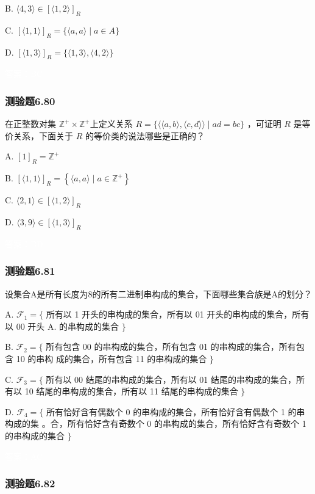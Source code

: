 \documentclass[UTF8, heading=true]{ctexart}
\begin{document}
B. $\langle 4,3\rangle \in[\langle 1,2\rangle]_R$

C. $[\langle 1,1\rangle]_R=\{\langle a, a\rangle \mid a \in A\}$

D. $[\langle 1,3\rangle]_R=\{\langle 1,3\rangle,\langle 4,2\rangle\}$


\textcolor{white}{答案：BC}

\subsubsection{测验题6.80}

在正整数对集 $\mathbb{Z}^{+} \times \mathbb{Z}^{+}$上定义关系 $R=\{\langle\langle a, b\rangle,\langle c, d\rangle\rangle \mid a d=b c\}$ ，可证明 $R$ 是等价关系，下面关于 $R$ 的等价类的说法哪些是正确的？

A. $[1]_R=\mathbb{Z}^{+}$

B. $[\langle 1,1\rangle]_R=\left\{\langle a, a\rangle \mid a \in \mathbb{Z}^{+}\right\}$

C. $\langle 2,1\rangle \in[\langle 1,2\rangle]_R$

D. $\langle 3,9\rangle \in[\langle 1,3\rangle]_R$

\textcolor{white}{答案：BD}

\subsubsection{测验题6.81}

设集合A是所有长度为8的所有二进制串构成的集合，下面哪些集合族是A的划分？

A. $\mathcal{F}_1=\{$ 所有以 1 开头的串构成的集合，所有以 01 开头的串构成的集合，所有以 00 开头 A. 的串构成的集合 $\}$

B. $\mathcal{F}_2=\{$ 所有包含 00 的串构成的集合，所有包含 01 的串构成的集合，所有包含 10 的串构
成的集合，所有包含 11 的串构成的集合 $\}$

C. $\mathcal{F}_3=\{$ 所有以 00 结尾的串构成的集合，所有以 01 结尾的串构成的集合，所有以 10 结尾的串构成的集合，所有以 11 结尾的串构成的集合 $\}$

D. $\mathcal{F}_4=\{$ 所有恰好含有偶数个 0 的串构成的集合，所有恰好含有偶数个 1 的串构成的集
。合，所有恰好含有奇数个 0 的串构成的集合，所有恰好含有奇数个 1 的串构成的集合 $\}$


\textcolor{white}{答案：AC}

\subsubsection{测验题6.82}
\end{document}
